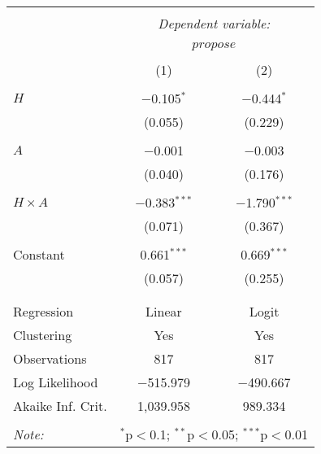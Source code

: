 
\begin{tabular}{@{\extracolsep{5pt}}lcc} 
\\[-1.8ex]\hline 
\hline \\[-1.8ex] 
 & \multicolumn{2}{c}{\textit{Dependent variable:}} \\ 
\cline{2-3} 
\\[-1.8ex] & \multicolumn{2}{c}{$propose$} \\ 
\\[-1.8ex] & (1) & (2)\\ 
\hline \\[-1.8ex] 
 $H$ & $-$0.105$^{*}$ & $-$0.444$^{*}$ \\ 
  & (0.055) & (0.229) \\ 
  & & \\ 
 $A$ & $-$0.001 & $-$0.003 \\ 
  & (0.040) & (0.176) \\ 
  & & \\ 
 $H\times A$ & $-$0.383$^{***}$ & $-$1.790$^{***}$ \\ 
  & (0.071) & (0.367) \\ 
  & & \\ 
 Constant & 0.661$^{***}$ & 0.669$^{***}$ \\ 
  & (0.057) & (0.255) \\ 
  & & \\ 
\hline \\[-1.8ex] 
Regression & Linear & Logit \\ 
Clustering & Yes & Yes \\ 
Observations & 817 & 817 \\ 
Log Likelihood & $-$515.979 & $-$490.667 \\ 
Akaike Inf. Crit. & 1,039.958 & 989.334 \\ 
\hline 
\hline \\[-1.8ex] 
\textit{Note:}  & \multicolumn{2}{r}{$^{*}$p$<$0.1; $^{**}$p$<$0.05; $^{***}$p$<$0.01} \\ 
\end{tabular} 
